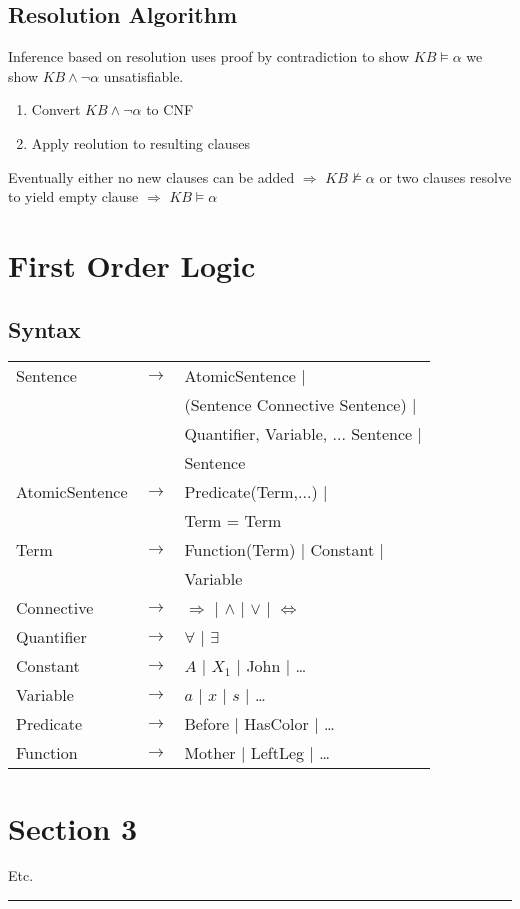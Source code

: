 \begin{multicols}{4}
\subsection{Resolution Algorithm}

Inference based on resolution uses proof by contradiction to show $KB \models \alpha$ we show $KB \land \lnot \alpha$ unsatisfiable.

\begin{enumerate}
\item Convert $KB \land \lnot \alpha$ to CNF
\item Apply reolution to resulting clauses
\end{enumerate}

Eventually either no new clauses can be added $\Rightarrow$ $KB \not\models \alpha$ or two clauses resolve to yield empty clause $\Rightarrow$ $KB \models \alpha$

\section{First Order Logic}
\subsection{Syntax}
\begin{tabular}{l l l}
Sentence		& $\rightarrow$	& AtomicSentence |\\
				&				& (Sentence Connective Sentence) |\\
				&				& Quantifier, Variable, ... Sentence |\\
				&				& Sentence \\
AtomicSentence	& $\rightarrow$	& Predicate(Term,...) |\\
				&				& Term = Term \\
Term			& $\rightarrow$	& Function(Term) | Constant |\\
				&				& Variable \\
Connective		& $\rightarrow$	& $\Rightarrow$ | $\land$ | $\lor$ | $\Leftrightarrow$ \\
Quantifier		& $\rightarrow$	& $\forall$ | $\exists$ \\
Constant		& $\rightarrow$	& $A$ | $X_1$ | John | \dots \\
Variable		& $\rightarrow$	& $a$ | $x$ | $s$ | \dots \\
Predicate		& $\rightarrow$	& Before | HasColor | \dots \\
Function		& $\rightarrow$	& Mother | LeftLeg | \dots \\
\end{tabular}
\section{Section 3}
Etc.

\rule{0.3\linewidth}{0.25pt}
\scriptsize



\end{multicols}